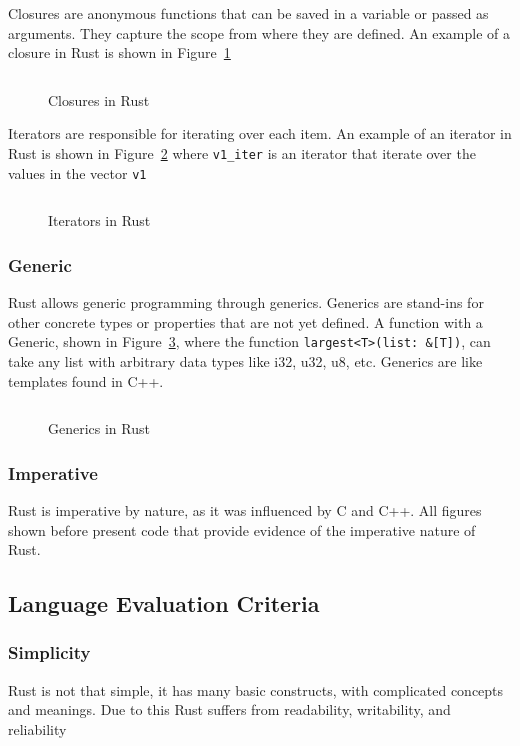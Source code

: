 \documentclass{article}
\newcommand{\rust}[1]{\inputminted{rust}{samples/rust/#1.rs}}
\newcommand{\rustin}[1]{\texttt{#1}}
\begin{document}
  Closures are anonymous functions that can be saved in a variable or passed as
  arguments. They capture the scope from where they are defined. An example of a
  closure in Rust is shown in Figure~\ref{fig:closure}

  \begin{figure}[ht]
    \rust{thread}
    \caption{Closures in Rust}
    \label{fig:closure}
  \end{figure}

  Iterators are responsible for iterating over each item. An example of an
  iterator in Rust is shown in Figure~\ref{fig:iterator} where \rustin{v1_iter}
  is an iterator that iterate over the values in the vector \rustin{v1}

  \begin{figure}[ht]
    \rust{iterator}
    \caption{Iterators in Rust}
    \label{fig:iterator}
  \end{figure}

  \subsubsection{Generic}
  Rust allows generic programming through generics. Generics are stand-ins for
  other concrete types or properties that are not yet defined. A function with a
  Generic, shown in Figure~\ref{fig:generic}, where the function
  \rustin{largest<T>(list: &[T])}, can take any list with arbitrary data types
  like i32, u32, u8, etc. Generics are like templates found in C++.

  \begin{figure}[ht]
    \rust{iterator}
    \caption{Generics in Rust}
    \label{fig:generic}
  \end{figure}


  \subsubsection{Imperative}
  Rust is imperative by nature, as it was influenced by C and C++. All figures
  shown before present code that provide evidence of the imperative nature of
  Rust.

  \subsection{Language Evaluation Criteria}

  \subsubsection{Simplicity}
  Rust is not that simple, it has many basic constructs, with complicated
  concepts and meanings. Due to this Rust suffers from readability, writability,
  and reliability
\end{document}
